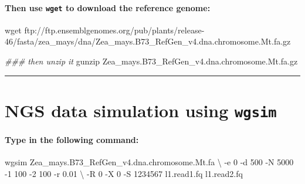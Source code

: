 \documentclass[]{article}
\newenvironment{Shaded}{\begin{snugshade}}{\end{snugshade}}
\newcommand{\CommentTok}[1]{\textcolor[rgb]{0.56,0.35,0.01}{\textit{#1}}}
\newcommand{\ExtensionTok}[1]{#1}
\newcommand{\FunctionTok}[1]{\textcolor[rgb]{0.00,0.00,0.00}{#1}}
\newcommand{\NormalTok}[1]{#1}
\let\oldparagraph\paragraph
\renewcommand{\paragraph}[1]{\oldparagraph{#1}\mbox{}}
\begin{document}
\hypertarget{then-use-wget-to-download-the-reference-genome}{%
\paragraph{\texorpdfstring{Then use \texttt{wget} to download the
reference
genome:}{Then use wget to download the reference genome:}}\label{then-use-wget-to-download-the-reference-genome}}

\begin{Shaded}
\begin{Highlighting}[]
\FunctionTok{wget}\NormalTok{ ftp://ftp.ensemblgenomes.org/pub/plants/release-46/fasta/zea_mays/dna/Zea_mays.B73_RefGen_v4.dna.chromosome.Mt.fa.gz}

\CommentTok{### then unzip it}
\FunctionTok{gunzip}\NormalTok{ Zea_mays.B73_RefGen_v4.dna.chromosome.Mt.fa.gz}
\end{Highlighting}
\end{Shaded}

\begin{center}\rule{0.5\linewidth}{0.5pt}\end{center}

\hypertarget{ngs-data-simulation-using-wgsim-1}{%
\section{\texorpdfstring{NGS data simulation using
\texttt{wgsim}}{NGS data simulation using wgsim}}\label{ngs-data-simulation-using-wgsim-1}}

\hypertarget{type-in-the-following-command-1}{%
\paragraph{Type in the following
command:}\label{type-in-the-following-command-1}}

\begin{Shaded}
\begin{Highlighting}[]
\ExtensionTok{wgsim}\NormalTok{ Zea_mays.B73_RefGen_v4.dna.chromosome.Mt.fa \textbackslash{}}
\NormalTok{-e 0 -d 500 -N 5000 -1 100 -2 100 -r 0.01  \textbackslash{}}
\NormalTok{-R 0 -X 0 -S 1234567 l1.read1.fq l1.read2.fq}
\end{Highlighting}
\end{Shaded}
\end{document}
